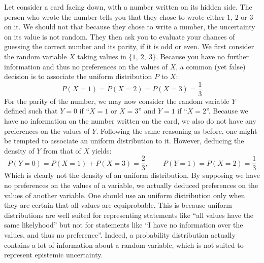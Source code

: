 \begin{example}\label{ex:proba_limitations}
    Let consider a card facing down, with a number written on its hidden side. The person who wrote the number tells you that they chose to wrote either $1$, $2$ or $3$ on it. We should not that because they chose to write a number, the uncertainty on its value is not random. They then ask you to evaluate your chances of guessing the correct number and its parity, \ie if it is odd or even. We first consider the random variable $X$ taking values in $\{1,~2,~3\}$. Because you have no further information and thus no preferences on the values of $X$, a common (yet false) decision is to associate the uniform distribution $P$ to $X$:
    \begin{equation*}
        P(X=1)=P(X=2)=P(X=3)=\frac{1}{3}
    \end{equation*}
    For the parity of the number, we may now consider the random variable $Y$ defined such that $Y=0$ if ``$X=1$ or $X=3$'' and $Y=1$ if ``$X=2$''. Because we have no information on the number written on the card, we also do not have any preferences on the values of $Y$. Following the same reasoning as before, one might be tempted to associate an uniform distribution to it. However, deducing the density of $Y$ from that of $X$ yields:
    \begin{equation*}
        P(Y=0)=P(X=1)+P(X=3)=\frac{2}{3},\qquad P(Y=1)=P(X=2) = \frac{1}{3}
    \end{equation*}
    Which is clearly not the density of an uniform distribution. By supposing we have no preferences on the values of a variable, we actually deduced preferences on the values of another variable. One should use an uniform distribution only when they are certain that all values are equiprobable. This is because uniform distributions are well suited for representing statements like ``all values have the same likelyhood'' but not for statements like ``I have no information over the values, and thus no preference''. Indeed, a probability distribution actually contains a lot of information about a random variable, which is not suited to represent epistemic uncertainty.
\end{example}

